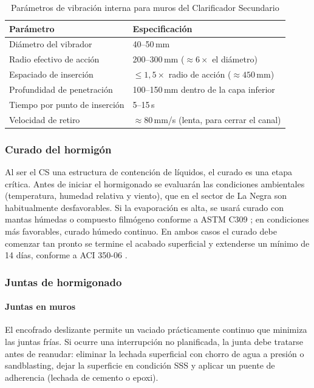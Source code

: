 \begin{table}[H]
  \centering
  \caption{Parámetros de vibración interna para muros del Clarificador Secundario}
  \label{tab:vibracion}
  \begin{tabular}{p{6cm} p{8.5cm}}
    \toprule
    Parámetro              & Especificación \\
    \midrule
    Diámetro del vibrador           & 40--50\,mm \\
    Radio efectivo de acción        & 200--300\,mm ($\approx 6 \times$ el diámetro) \\
    Espaciado de inserción          & $\leq 1{,}5 \times$ radio de acción ($\approx 450$\,mm) \\
    Profundidad de penetración      & 100--150\,mm dentro de la capa inferior \\
    Tiempo por punto de inserción   & 5--15\,s \\
    Velocidad de retiro             & $\approx 80$\,mm/s (lenta, para cerrar el canal) \\
    \bottomrule
  \end{tabular}
\end{table}

\subsubsection{Curado del hormigón}

Al ser el CS una estructura de contención de líquidos, el curado es una etapa crítica. Antes de iniciar el hormigonado se evaluarán las condiciones ambientales (temperatura, humedad relativa y viento), que en el sector de La Negra son habitualmente desfavorables. Si la evaporación es alta, se usará curado con mantas húmedas o compuesto filmógeno conforme a ASTM C309 \cite{ASTMC309}; en condiciones más favorables, curado húmedo continuo. En ambos casos el curado debe comenzar tan pronto se termine el acabado superficial y extenderse un mínimo de 14 días, conforme a ACI 350-06 \cite{ACI350}.

\subsubsection{Juntas de hormigonado}

\paragraph{Juntas en muros}

El encofrado deslizante permite un vaciado prácticamente continuo que minimiza las juntas frías. Si ocurre una interrupción no planificada, la junta debe tratarse antes de reanudar: eliminar la lechada superficial con chorro de agua a presión o sandblasting, dejar la superficie en condición SSS y aplicar un puente de adherencia (lechada de cemento o epoxi).

